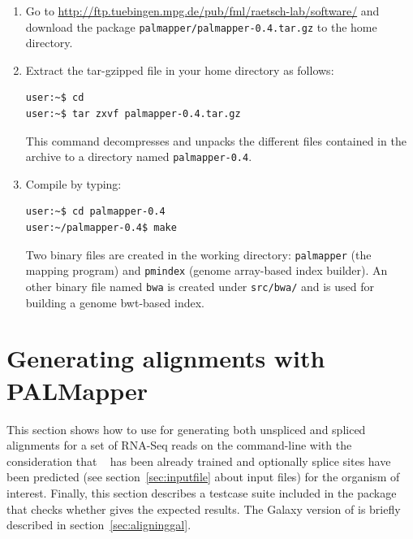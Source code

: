 \documentclass{article}
\begin{document}
\begin{enumerate}
\item Go to \url{http://ftp.tuebingen.mpg.de/pub/fml/raetsch-lab/software/}
    and download the package \texttt{palmapper/palmapper-0.4.tar.gz}
    to the home directory. 

\item Extract the tar-gzipped file in your home directory as follows:
\begin{verbatim}user:~$ cd
user:~$ tar zxvf palmapper-0.4.tar.gz\end{verbatim}
This command decompresses and unpacks the different files contained in
the archive to a directory named \texttt{palmapper-0.4}.

\item Compile \PALMapper{} by typing:
\begin{verbatim}user:~$ cd palmapper-0.4
user:~/palmapper-0.4$ make\end{verbatim}
Two binary files are created in the working directory: \texttt{palmapper} (the
mapping program) and \texttt{pmindex} (genome array-based index
builder). An other binary file named \texttt{bwa} is created under
\texttt{src/bwa/} and is used for building a genome bwt-based index.
\end{enumerate}

\section{Generating alignments with PALMapper}
\label{sec:aligning}

This section shows how to use \PALMapper{} for generating both unspliced
and spliced alignments for a set of RNA-Seq reads on the
command-line with the consideration that \QP{}~\cite{DeBona08} has
been already trained and optionally splice sites have been predicted
(see section~\ref{sec:inputfile} about input files) for the organism
of interest. Finally, this section describes a testcase suite included in
the package that checks whether \PALMapper{} gives the expected
results. The Galaxy version of \PALMapper{} is briefly described in
section~\ref{sec:aligninggal}. 
\end{document}
